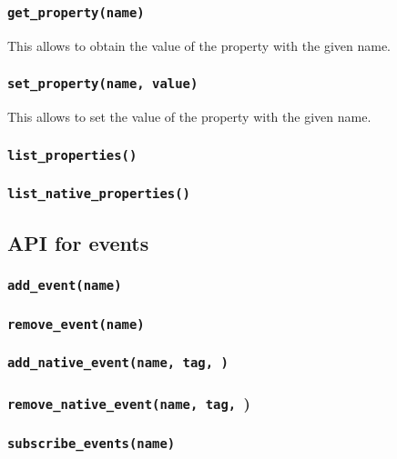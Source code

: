 \documentclass{note}
\begin{document}
\subsubsection{\textcolor{red2}{\texttt{get\_property(name)}}}
This allows to obtain the value of the property with the given name.

\subsubsection{\textcolor{red2}{\texttt{set\_property(name, value)}}}
This allows to set the value of the property with the given name.

\subsubsection{\textcolor{red2}{\texttt{list\_properties()}}}
\subsubsection{\textcolor{red2}{\texttt{list\_native\_properties()}}}


\subsection{API for events}

\subsubsection{\textcolor{red2}{\texttt{add\_event(name)}}}
\subsubsection{\textcolor{red2}{\texttt{remove\_event(name)}}}
\subsubsection{\textcolor{red2}{\texttt{add\_native\_event(name, tag, \textrm{})}}}
\subsubsection{\textcolor{red2}{\texttt{remove\_native\_event(name, tag, \textrm{}})}}
\subsubsection{\textcolor{red2}{\texttt{subscribe\_events(name)}}}
\end{document}
